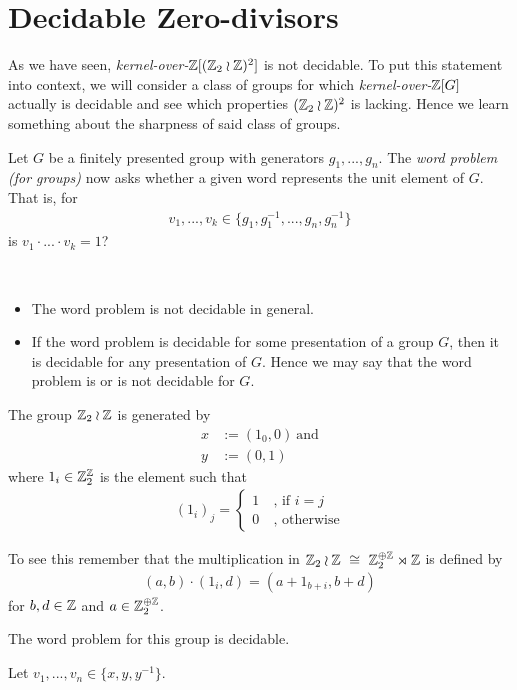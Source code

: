 \section{Decidable Zero-divisors}


As we have seen, \emph{kernel-over-$\mathbb{Z}[(\mathbb{Z}_2 \wr \mathbb{Z})^2]$} is not decidable.
To put this statement into context, we will consider a class of groups for which \emph{kernel-over-$\mathbb{Z}[G]$} actually is decidable and see which properties $(\mathbb{Z}_2 \wr \mathbb{Z})^2$ is lacking.
Hence we learn something about the sharpness of said class of groups.

\begin{Definition}
	Let $G$ be a finitely presented group with generators $g_1,...,g_n$.
	The \emph{word problem (for groups)} now asks whether a given word represents the unit element of $G$. That is, for
	\begin{align*}
		v_1,...,v_k \in \{g_1,g_1^{-1},...,g_n,g_n^{-1}\}
	\end{align*}
	is $v_1 \cdot ... \cdot v_k = 1$?
\end{Definition}

\begin{Remark}
	\
	\begin{itemize}
		\item The word problem is not decidable in general. %
		\item If the word problem is decidable for some presentation of a group $G$, then it is decidable for any presentation of $G$.
			Hence we may say that the word problem is or is not decidable for $G$.
	\end{itemize}
\end{Remark}

\begin{Example}
	The group $\mathbb{Z}_2 \wr \mathbb{Z}$ is generated by
	\begin{align*}
		x &:= (1_0,0) ~\text{and} \\
		y &:= (0,1)
	\end{align*}
	where $1_i \in \mathbb{Z}_2^{\mathbb{Z}}$ is the element such that
	\begin{align*}
		 (1_i)_j = \begin{cases} 1~ &\text{, if $i = j$} \\ 0~ &\text{, otherwise} \end{cases}
	\end{align*}

	To see this remember that the multiplication in $\mathbb{Z}_2 \wr \mathbb{Z} ~\cong~ \mathbb{Z}_2^{\oplus \mathbb{Z}} \rtimes \mathbb{Z}$ is defined by
	\begin{align*}
		(a,b) \cdot (1_i,d) = (a + 1_{b+i}, b+d)
	\end{align*}
	for $b,d \in \mathbb{Z}$ and $a \in \mathbb{Z}_2^{\oplus \mathbb{Z}}$.

	The word problem for this group is decidable.
\end{Example}
\proof
	Let $v_1,...,v_n \in \{x,y,y^{-1}\}$.

